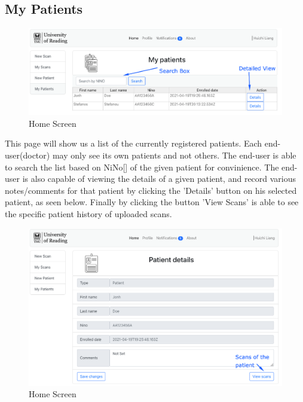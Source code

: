 		\subsection{My Patients}
			\begin{figure}[H]
				\iftrue
				\centering
				\caption{Home Screen}
				\includegraphics[scale=0.3]{figures/mypatients}
				\fi
			\end{figure}
			This page will show us a list of the currently registered patients. Each end-user(doctor) may only see its own patients and not others.
			The end-user is able to search the list based on NiNo[\cite{nino-format}] of the given patient for convinience. The end-user is also
			capable of viewing the details of a given patient, and record various notes/comments for that patient by clicking the 'Details' button
			on his selected patient, as seen below. Finally by clicking the button 'View Scans' is able to see the specific patient history of uploaded
			scans.
			\begin{figure}[H]
				\iftrue
				\centering
				\caption{Home Screen}
				\includegraphics[scale=0.3]{figures/mypatients2}
				\fi
			\end{figure}
